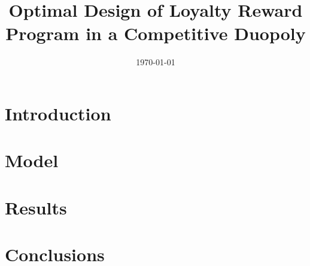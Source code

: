 \documentclass[12pt,a4paper]{article}
\title{Optimal Design of Loyalty Reward Program in a Competitive Duopoly}
\date{\today}
\begin{document}
\maketitle

\section{Introduction}
\label{sec:intro}

\section{Model}
\label{sec:model}

\section{Results}
\label{sec:results}

\section{Conclusions}
\label{sec:conc}




\end{document}
